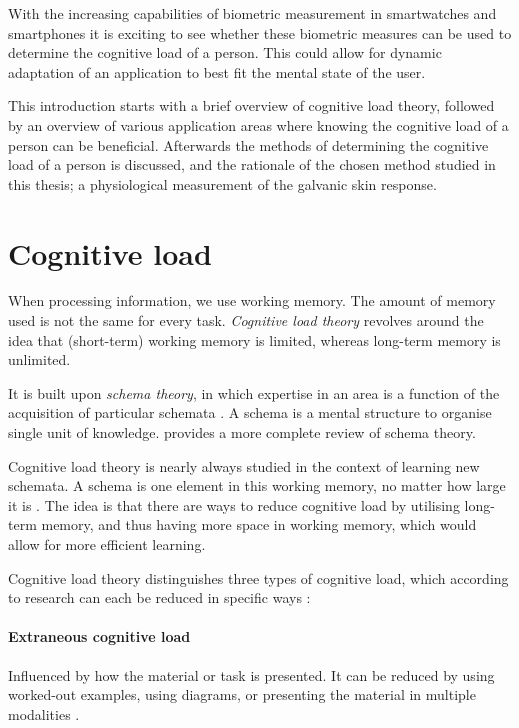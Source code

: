 \documentclass[11pt,leqno,a4paper]{report} %
\begin{document}
With the increasing capabilities of biometric measurement in smartwatches and smartphones it is exciting to see whether these biometric measures can be used to determine the cognitive load of a person. This could allow for dynamic adaptation of an application to best fit the mental state of the user.

This introduction starts with a brief overview of cognitive load theory, followed by an overview of various application areas where knowing the cognitive load of a person can be beneficial. Afterwards the methods of determining the cognitive load of a person is discussed, and the rationale of the chosen method studied in this thesis; a physiological measurement of the galvanic skin response.

\section{Cognitive load}
When processing information, we use working memory. The amount of memory used is not the same for every task. \emph{Cognitive load theory} \citep{Oviatt2004} revolves around the idea that (short-term) working memory is limited, whereas long-term memory is unlimited. 

It is built upon \emph{schema theory}, in which expertise in an area is a function of the acquisition of particular schemata \citep{bartlett1995remembering}. A schema is a mental structure to organise single unit of knowledge. \citep{mcvee2005schema} provides a more complete review of schema theory.

\pagebreak

Cognitive load theory is nearly always studied in the context of learning new schemata. A schema is one element in this working memory, no matter how large it is \citep{mayer2014cambridge}. The idea is that there are ways to reduce cognitive load by utilising long-term memory, and thus having more space in working memory, which would allow for more efficient learning.

Cognitive load theory distinguishes three types of cognitive load, which according to research can each be reduced in specific ways \citep{mayer2002multimedia}:


\paragraph{Extraneous cognitive load}
Influenced by how the material or task is presented. It can be reduced by using worked-out examples, using diagrams, or presenting the material in multiple modalities \citep{mousavi1995reducing}.
\end{document}
